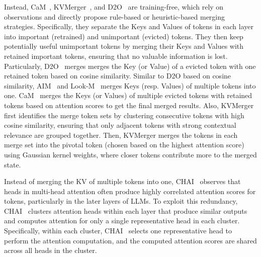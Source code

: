 Instead, CaM~\cite{DBLP:conf/icml/0002DLZ00J24}, KVMerger~\cite{DBLP:journals/corr/abs-2407-08454}, and D2O~\cite{DBLP:journals/corr/abs-2406-13035} are training-free, which rely on observations and directly propose rule-based or heuristic-based merging strategies.
Specifically,
they
separate the Keys and Values of tokens in each layer into important (retrained) and unimportant (evicted) tokens. 
They then keep potentially useful unimportant tokens by merging their Keys and Values with  retained important tokens, ensuring that no valuable information is lost.
Particularly, D2O~\cite{DBLP:journals/corr/abs-2406-13035} merges merges  the Key (or Value) of a evicted token with one retained token based on cosine similarity.
Similar to D2O based on cosine similarity, AIM~\cite{zhong2024aim} and Look-M~\cite{DBLP:conf/emnlp/WanWLHZJW024}  merges Keys (resp. Values) of multiple tokens into one.
CaM~\cite{DBLP:conf/icml/0002DLZ00J24} merges  the Keys (or Values) of multiple evicted tokens with  retained tokens based on attention scores to get the final merged results.
Also, KVMerger~\cite{DBLP:journals/corr/abs-2407-08454} first identifies the merge token sets by clustering consecutive tokens with high cosine similarity, ensuring that only adjacent tokens with strong contextual relevance are grouped together. Then, KVMerger merges the tokens in each merge set into the pivotal token (chosen based on the highest attention score) using Gaussian kernel weights, where closer tokens contribute more to the merged state.

Instead of merging the KV of multiple tokens into one, CHAI~\cite{agarwalCHAIClusteredHead2024} observes that heads in multi-head attention often produce highly correlated attention scores for tokens, particularly in the later layers of LLMs. 
To exploit this redundancy, CHAI~\cite{agarwalCHAIClusteredHead2024} clusters attention heads within each layer that produce similar outputs and computes attention for only a single representative head in each cluster.
Specifically, within each cluster, CHAI~\cite{agarwalCHAIClusteredHead2024} selects one representative head to perform the attention computation, and the computed attention scores are shared across all heads in the cluster.





